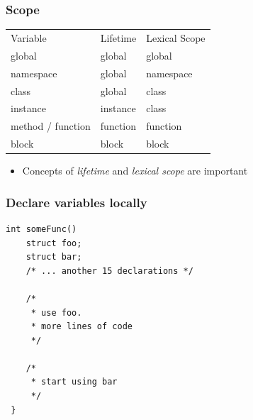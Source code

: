 \documentclass[table]{beamer}
\newcounter{rulecount}
\newcommand{\declarerule}{\textbf{\color{themeblue}{Rule \therulecount:}} }
\newcommand{\declarelesson}{\textbf{\color{themegreen}{Lesson:}} }
\begin{document}
\begin{frame}
    \frametitle{\declarelesson Scope}

    \begin{table}[tl]
        \begin{tabular}{p{3cm}p{2.5cm}p{2.5cm}}
            \rowcolor{codebg}
            \color{white} Variable & \color{white} Lifetime & \color{white} Lexical Scope\\
                          global & global & global \\
                       namespace & global & namespace \\
                        class & global & class \\
                     instance & instance & class \\
                     method / function & function & function \\
                     block & block & block \\
        \end{tabular}
    \end{table}
    \begin{itemize}
        \item Concepts of \emph{lifetime} and \emph{lexical scope} are important
    \end{itemize}
\end{frame}




\begin{frame}[fragile]
    \frametitle{\declarerule Declare variables locally}
    \begin{lstlisting}[title=In ANSI C variables must be declared at the beginning of scope]
int someFunc() 
    struct foo;
    struct bar;
    /* ... another 15 declarations */

    /* 
     * use foo.
     * more lines of code
     */

    /* 
     * start using bar
     */
 }
    \end{lstlisting}
\end{frame}
\end{document}
